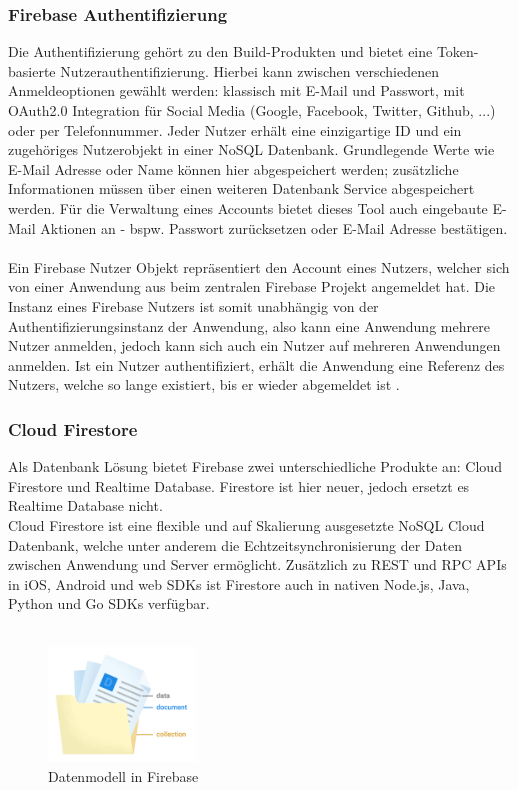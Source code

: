 \subsubsection{Firebase Authentifizierung}
Die Authentifizierung gehört zu den \glqq Build\grqq -Produkten und bietet eine Token-basierte Nutzerauthentifizierung. 
Hierbei kann zwischen verschiedenen Anmeldeoptionen gewählt werden: klassisch mit E-Mail und Passwort, mit OAuth2.0 Integration für Social Media (Google, Facebook, Twitter, Github, ...) oder per Telefonnummer.
Jeder Nutzer erhält eine einzigartige ID und ein zugehöriges Nutzerobjekt in einer NoSQL Datenbank. Grundlegende Werte wie E-Mail Adresse oder Name können hier abgespeichert werden; zusätzliche Informationen müssen über einen weiteren Datenbank Service abgespeichert werden.
Für die Verwaltung eines Accounts bietet dieses Tool auch eingebaute E-Mail Aktionen an - bspw. Passwort zurücksetzen oder E-Mail Adresse bestätigen.\\
\\
Ein Firebase Nutzer Objekt repräsentiert den Account eines Nutzers, welcher sich von einer Anwendung aus beim zentralen Firebase Projekt angemeldet hat.
Die Instanz eines Firebase Nutzers ist somit unabhängig von der Authentifizierungsinstanz der Anwendung, also kann eine Anwendung mehrere Nutzer anmelden, jedoch kann sich auch ein Nutzer auf mehreren Anwendungen anmelden.
Ist ein Nutzer authentifiziert, erhält die Anwendung eine Referenz des Nutzers, welche so lange existiert, bis er wieder abgemeldet ist \cite{firebase2021}.

\subsubsection{Cloud Firestore}
\label{sec:firestore}
Als Datenbank Lösung bietet Firebase zwei unterschiedliche Produkte an: Cloud Firestore und Realtime Database.
Firestore ist hier neuer, jedoch ersetzt es Realtime Database nicht. \\
Cloud Firestore ist eine flexible und auf Skalierung ausgesetzte NoSQL Cloud Datenbank, welche unter anderem die Echtzeitsynchronisierung der Daten zwischen Anwendung und Server ermöglicht.
Zusätzlich zu REST und RPC APIs in iOS, Android und web SDKs ist Firestore auch in nativen Node.js, Java, Python und Go SDKs verfügbar.\\
\\

\begin{figure}
	\centering
	\includegraphics[width=0.35\textwidth]{./Theoretische_Grundlagen/images/firestore_datastucture.png}
	\caption[Datenmodell in Firebase]{Datenmodell in Firebase \cite{firebase2021}}
	\label{fig:firestore_data_structure}
\end{figure}

